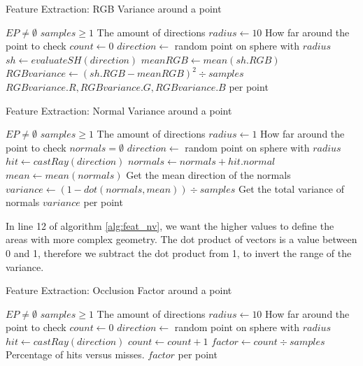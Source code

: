 \begin{algorithm}
	\caption{Feature Extraction: RGB Variance around a point}
	\label{alg:feat_rgbv}
	\begin{algorithmic}[1]
		\Require $EP \neq \emptyset$
		\Require $samples \geq 1$ \Comment The amount of directions
		\State $radius \gets 10$ \Comment How far around the point to check
			\State $count \gets 0$
				\State $direction \gets$ random point on sphere with $radius$
				\State $sh \gets evaluateSH(direction)$
			\EndFor
			\State $meanRGB \gets mean(sh.RGB)$
			\State $RGBvariance \gets (sh.RGB - meanRGB)^2 \div samples$
		\EndFor
		\State \Return ${RGBvariance.R, RGBvariance.G, RGBvariance.B}$ per point
	\end{algorithmic}
\end{algorithm}

\begin{algorithm}
	\caption{Feature Extraction: Normal Variance around a point}
	\label{alg:feat_nv}
	\begin{algorithmic}[1]
		\Require $EP \neq \emptyset$
		\Require $samples \geq 1$ \Comment The amount of directions
		\State $radius \gets 1$ \Comment How far around the point to check
			\State $normals = \emptyset$
				\State $direction \gets$ random point on sphere with $radius$
				\State $hit \gets castRay(direction)$
					\State $normals \gets normals + hit.normal$
				\EndIf
			\EndFor
			\State $mean \gets mean(normals)$ \Comment Get the mean direction of the normals
			\State $variance \gets (1- dot(normals, mean)) \div samples$
			\label{alg:feat_nv:12}
			\Comment Get the total variance of normals
		\EndFor
		\State \Return $variance$ per point
	\end{algorithmic}
\end{algorithm}

In line 12 of algorithm \ref{alg:feat_nv}, we want the higher values to define the areas with more complex geometry. The dot product of vectors is a value between 0 and 1, therefore we subtract the dot product from 1, to invert the range of the variance.\newline

\begin{algorithm}
	\caption{Feature Extraction: Occlusion Factor around a point}
	\label{alg:feat_of}
	\begin{algorithmic}[1]
		\Require $EP \neq \emptyset$
		\Require $samples \geq 1$ \Comment The amount of directions
		\State $radius \gets 10$ \Comment How far around the point to check
			\State $count \gets 0$
				\State $direction \gets$ random point on sphere with $radius$
				\State $hit \gets castRay(direction)$
					\State $count \gets count + 1$
				\EndIf
			\EndFor
			\State $factor \gets count \div samples$
			\Comment Percentage of hits versus misses.
		\EndFor
		\State \Return $factor$ per point
	\end{algorithmic}
\end{algorithm}


